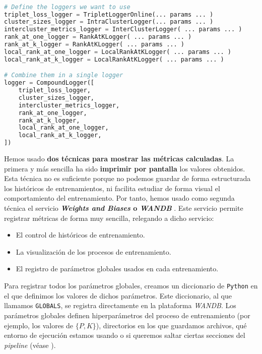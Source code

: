 \begin{lstlisting}[language=python, caption=Ejemplo de configuración del \textit{logging} de un entrenamiento con nuestro sistema propio. Se ve claramente la ventaja de usar un patrón \textit{composite} a la hora de configurar qué \textit{loggers} queremos usar, captionpos=b]

# Define the loggers we want to use
triplet_loss_logger = TripletLoggerOnline(... params ... )
cluster_sizes_logger = IntraClusterLogger(... params ... )
intercluster_metrics_logger = InterClusterLogger( ... params ... )
rank_at_one_logger = RankAtKLogger( ... params ... )
rank_at_k_logger = RankAtKLogger( ... params ... )
local_rank_at_one_logger = LocalRankAtKLogger( ... params ... )
local_rank_at_k_logger = LocalRankAtKLogger( ... params ... )

# Combine them in a single logger
logger = CompoundLogger([
    triplet_loss_logger,
    cluster_sizes_logger,
    intercluster_metrics_logger,
    rank_at_one_logger,
    rank_at_k_logger,
    local_rank_at_one_logger,
    local_rank_at_k_logger,
])
\end{lstlisting}

Hemos usado \textbf{dos técnicas para mostrar las métricas calculadas}. La primera y más sencilla ha sido \textbf{imprimir por pantalla} los valores obtenidos. Esta técnica no es suficiente porque no podemos guardar de forma estructurada los históricos de entrenamientos, ni facilita estudiar de forma visual el comportamiento del entrenamiento. Por tanto, hemos usado como segunda técnica el servicio \textbf{\textit{Weights and Biases} o \textit{WANDB}} \cite{informatica:wandb_web}. Este servicio permite registrar métricas de forma muy sencilla, relegando a dicho servicio:

\begin{itemize}
	\item El control de históricos de entrenamiento.
	\item La visualización de los procesos de entrenamiento.
	\item El registro de parámetros globales usados en cada entrenamiento.
\end{itemize}

Para registrar todos los parámetros globales, creamos un diccionario de \lstinline{Python} en el que definimos los valores de dichos parámetros. Este diccionario, al que llamamos \lstinline{GLOBALS}, se registra directamente en la plataforma \textit{WANDB}. Los parámetros globales definen hiperparámetros del proceso de entrenamiento (por ejemplo, los valores de $\{P, K\}$), directorios en los que guardamos archivos, qué entorno de ejecución estamos usando o si queremos saltar ciertas secciones del \textit{pipeline} (véase ).

